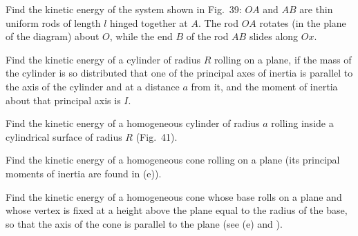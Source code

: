 
\begin{problem}[title={Kinetic energy of two hinged rods}]
{
Find the kinetic energy of the system shown in Fig.~39: $OA$ and $AB$ are thin uniform rods of length $l$ hinged together at $A$. The rod $OA$ rotates (in the plane of the diagram) about $O$, while the end $B$ of the rod $AB$ slides along $Ox$.
}
{}
{}
\end{problem}


\begin{problem}[title={Unbalanced rolling cylinder: kinetic energy}]
{
Find the kinetic energy of a cylinder of radius $R$ rolling on a plane, if the mass of the cylinder is so distributed that one of the principal axes of inertia is parallel to the axis of the cylinder and at a distance $a$ from it, and the moment of inertia about that principal axis is $I$.
}
{}
{}
\end{problem}


\begin{problem}[title={Cylinder inside a cylinder: kinetic energy}]
{
Find the kinetic energy of a homogeneous cylinder of radius $a$ rolling inside a cylindrical surface of radius $R$ (Fig.~41).
}
{}
{}
\end{problem}


\begin{problem}[title={Kinetic energy of a cone rolling on a plane}]
{
Find the kinetic energy of a homogeneous cone rolling on a plane (its principal moments of inertia are found in (e)).
}
{}
{}
\end{problem}


\begin{problem}[title={Rolling cone, horizontal axis: kinetic energy}]
{
Find the kinetic energy of a homogeneous cone whose base rolls on a plane and whose vertex is fixed at a height above the plane equal to the radius of the base, so that the axis of the cone is parallel to the plane (see (e) and ).
}
{}
{}
\end{problem}



